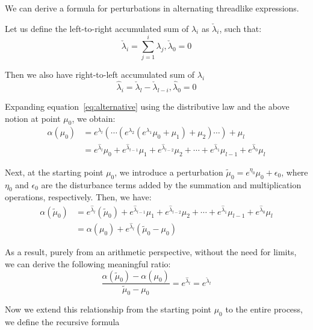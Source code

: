 \documentclass{article}
\numberwithin{definition}{section}
\numberwithin{lemma}{section}
\numberwithin{proposition}{section}
\numberwithin{corollary}{section}
\numberwithin{theorem}{section}
\begin{document}
We can derive a formula for perturbations in alternating threadlike expressions.

Let us define the left-to-right accumulated sum of $\lambda_i$ as $\check{\lambda}_i$, such that:
\begin{equation}
    \check{\lambda}_i = \sum_{j=1}^i \lambda_j, \check{\lambda}_0 = 0\label{eq:accsumlr}
\end{equation}

Then we also have right-to-left accumulated sum of $\lambda_i$
\begin{equation}
    \hat{\lambda}_i = \check{\lambda}_l - \check{\lambda}_{l - i}, \hat{\lambda}_0 = 0\label{eq:accsumrl}
\end{equation}

Expanding equation~\eqref{eq:alternative} using the distributive law and the above notion at point $\mu_0$, we obtain:
\begin{align}
    \alpha(\mu_0) & = e^{\lambda_l}(\cdots (e^{\lambda_2} (e^{\lambda_1} \mu_0 + \mu_1) + \mu_2) \cdots) + \mu_l \\
    & = e^{\hat{\lambda}_l} \mu_0 + e^{\hat{\lambda}_{l - 1}} \mu_1  + e^{\hat{\lambda}_{l - 2}} \mu_2 + \cdots + e^{\hat{\lambda}_1} \mu_{l - 1} + e^{\hat{\lambda}_0} \mu_l
\end{align}

Next, at the starting point $\mu_0$, we introduce a perturbation $\tilde{\mu}_0 = e^{\eta_0} \mu_0 + \epsilon_0$,
where $\eta_0$ and $\epsilon_0$ are the disturbance terms added by the summation and multiplication operations, respectively.
Then, we have:
\begin{align}
    \alpha(\tilde{\mu}_0) & = e^{\hat{\lambda}_l} (\tilde{\mu}_0) + e^{\hat{\lambda}_{l - 1}} \mu_1  + e^{\hat{\lambda}_{l - 2}} \mu_2 + \cdots + e^{\hat{\lambda}_1} \mu_{l - 1} + e^{\hat{\lambda}_0} \mu_l \\
    & = \alpha(\mu_0) + e^{\hat{\lambda}_l} (\tilde{\mu}_0 - \mu_0)
\end{align}

As a result, purely from an arithmetic perspective, without the need for limits, we can derive the following meaningful ratio:
\begin{equation}
    \frac{\alpha(\tilde{\mu}_0) - \alpha(\mu_0)}{\tilde{\mu}_0 - \mu_0} = e^{\hat{\lambda}_l} = e^{\check{\lambda}_l}\label{eq:ratio1}
\end{equation}

Now we extend this relationship from the starting point $\mu_0$ to the entire process, we define the recursive formula
\end{document}
